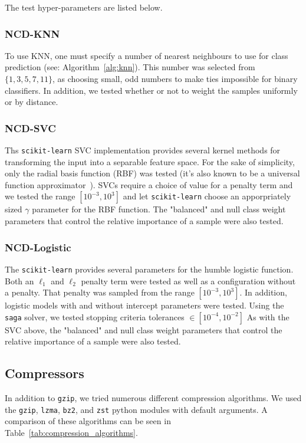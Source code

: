 \documentclass[conference]{IEEEtran}
\begin{document}
The test hyper-parameters are listed below.

\label{models}
\subsubsection{NCD-KNN}
To use KNN, one must specify a number of nearest neighbours to use for class prediction (see: Algorithm~\ref{alg:knn}). This number was selected from $\{1,3,5,7,11\}$, as choosing small, odd numbers to make ties impossible for binary classifiers. In addition, we tested whether or not to weight the samples uniformly or by distance. 

\subsubsection{NCD-SVC}
Ths \texttt{scikit-learn} SVC implementation provides several kernel methods for transforming the input into a separable feature space. 
For the sake of simplicity, only the radial basis function (RBF) was tested (it's also known to be a universal function approximator~\cite{}). 
SVCs require a choice of value for a penalty term and we tested the range $[ 10^{-3}, 10^3]$ and let \texttt{scikit-learn} choose an apporpriately sized $\gamma$ parameter for the RBF function. 
The "balanced" and null class weight parameters that control the relative importance of a sample were also tested.

\subsubsection{NCD-Logistic}
The \texttt{scikit-learn} provides several parameters for the humble logistic function. Both an $\ell_1$ and $\ell_2$ penalty term were tested as well as a configuration without a penalty. That penalty was sampled from the range $[10^{-3}, 10^3]$. In addition, logistic models with and without intercept parameters were tested. Using the \texttt{saga} solver, we tested stopping criteria tolerances $\in [10^{-4}, 10^{-2}]$
As with the SVC above, the "balanced" and null class weight parameters that control the relative importance of a sample were also tested.

\subsection{Compressors}
\label{compressors}
In addition to \texttt{gzip}, we tried numerous different compression algorithms. We used the \texttt{gzip}, \texttt{lzma}, \texttt{bz2}, and \texttt{zst} python modules with default arguments. A comparison of these algorithms can be seen in Table~\ref{tab:compression_algorithms}.
\end{document}
